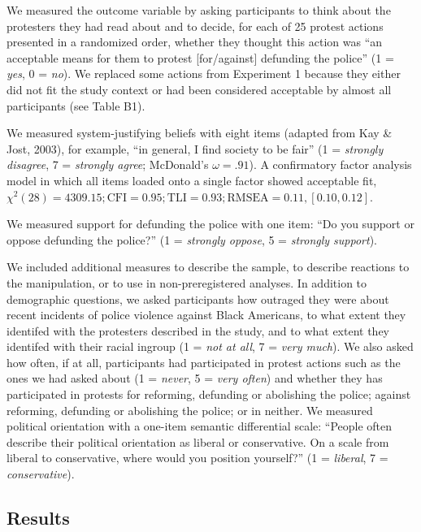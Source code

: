 \documentclass[twocolumn, 11pt, letterpaper]{article}
\begin{document}
We measured the outcome variable by asking participants to think about
the protesters they had read about and to decide, for each of 25 protest
actions presented in a randomized order, whether they thought this
action was ``an acceptable means for them to protest {[}for/against{]}
defunding the police'' (1 = \emph{yes}, 0 = \emph{no}). We replaced some
actions from Experiment 1 because they either did not fit the study
context or had been considered acceptable by almost all participants
(see Table B1).

We measured system-justifying beliefs with eight items (adapted from Kay
\& Jost, 2003), for example, ``in general, I find society to be fair''
(1 = \emph{strongly disagree}, 7 = \emph{strongly agree}; McDonald's
\(\omega = .91\)). A confirmatory factor analysis model in which all
items loaded onto a single factor showed acceptable fit,
\(\chi^2 (28) = 4309.15; \text{CFI} = 0.95; \text{TLI} = 0.93; \text{RMSEA} = 0.11, [0.10, 0.12]\).

We measured support for defunding the police with one item: ``Do you
support or oppose defunding the police?'' (1 = \emph{strongly oppose}, 5
= \emph{strongly support}).

We included additional measures to describe the sample, to describe
reactions to the manipulation, or to use in non-preregistered analyses.
In addition to demographic questions, we asked participants how outraged
they were about recent incidents of police violence against Black
Americans, to what extent they identifed with the protesters described
in the study, and to what extent they identifed with their racial
ingroup (1 = \emph{not at all}, 7 = \emph{very much}). We also asked how
often, if at all, participants had participated in protest actions such
as the ones we had asked about (1 = \emph{never}, 5 = \emph{very often})
and whether they has participated in protests for reforming, defunding
or abolishing the police; against reforming, defunding or abolishing the
police; or in neither. We measured political orientation with a one-item
semantic differential scale: ``People often describe their political
orientation as liberal or conservative. On a scale from liberal to
conservative, where would you position yourself?'' (1 = \emph{liberal},
7 = \emph{conservative}).

\hypertarget{results-1}{%
\subsection{Results}\label{results-1}}
\end{document}

